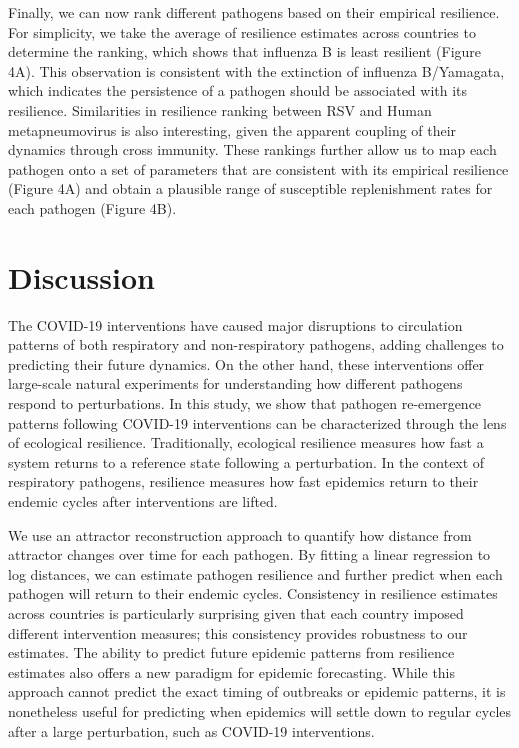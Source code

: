\documentclass[12pt]{article}
\begin{document}
Finally, we can now rank different pathogens based on their empirical resilience.
For simplicity, we take the average of resilience estimates across countries to determine the ranking, which shows that influenza B is least resilient (Figure 4A).
This observation is consistent with the extinction of influenza B/Yamagata, which indicates the persistence of a pathogen should be associated with its resilience.
Similarities in resilience ranking between RSV and Human metapneumovirus is also interesting, given the apparent coupling of their dynamics through cross immunity.
These rankings further allow us to map each pathogen onto a set of parameters that are consistent with its empirical resilience (Figure 4A) and obtain a plausible range of susceptible replenishment rates for each pathogen (Figure 4B).

\section*{Discussion}

The COVID-19 interventions have caused major disruptions to circulation patterns of both respiratory and non-respiratory pathogens, adding challenges to predicting their future dynamics.
On the other hand, these interventions offer large-scale natural experiments for understanding how different pathogens respond to perturbations.
In this study, we show that pathogen re-emergence patterns following COVID-19 interventions can be characterized through the lens of ecological resilience.
Traditionally, ecological resilience measures how fast a system returns to a reference state following a perturbation.
In the context of respiratory pathogens, resilience measures how fast epidemics return to their endemic cycles after interventions are lifted.

We use an attractor reconstruction approach to quantify how distance from attractor changes over time for each pathogen.
By fitting a linear regression to log distances, we can estimate pathogen resilience and further predict when each pathogen will return to their endemic cycles.
Consistency in resilience estimates across countries is particularly surprising given that each country imposed different intervention measures; this consistency provides robustness to our estimates.
The ability to predict future epidemic patterns from resilience estimates also offers a new paradigm for epidemic forecasting.
While this approach cannot predict the exact timing of outbreaks or epidemic patterns, it is nonetheless useful for predicting when epidemics will settle down to regular cycles after a large perturbation, such as COVID-19 interventions.
\end{document}

